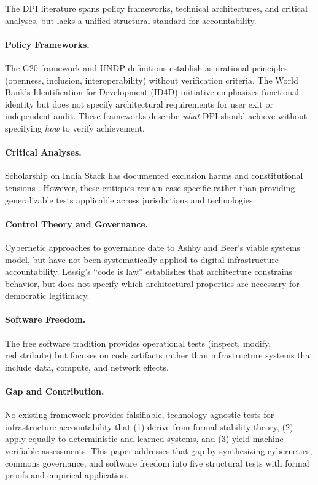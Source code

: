 \documentclass{article}
\begin{document}
The DPI literature spans policy frameworks, technical architectures, and critical analyses, but lacks a unified structural standard for accountability.

\paragraph{Policy Frameworks.} The G20 framework \citep{g20} and UNDP definitions \citep{undp} establish aspirational principles (openness, inclusion, interoperability) without verification criteria. The World Bank's Identification for Development (ID4D) initiative emphasizes functional identity but does not specify architectural requirements for user exit or independent audit. These frameworks describe \textit{what} DPI should achieve without specifying \textit{how} to verify achievement.

\paragraph{Critical Analyses.} Scholarship on India Stack has documented exclusion harms \citep{khera2019} and constitutional tensions \citep{bhatia2019}. However, these critiques remain case-specific rather than providing generalizable tests applicable across jurisdictions and technologies.

\paragraph{Control Theory and Governance.} Cybernetic approaches to governance date to Ashby \citep{ashby1956} and Beer's viable systems model, but have not been systematically applied to digital infrastructure accountability. Lessig's ``code is law'' \citep{lessig2006} establishes that architecture constrains behavior, but does not specify which architectural properties are necessary for democratic legitimacy.

\paragraph{Software Freedom.} The free software tradition \citep{stallman2002} provides operational tests (inspect, modify, redistribute) but focuses on code artifacts rather than infrastructure systems that include data, compute, and network effects.

\paragraph{Gap and Contribution.} No existing framework provides falsifiable, technology-agnostic tests for infrastructure accountability that (1) derive from formal stability theory, (2) apply equally to deterministic and learned systems, and (3) yield machine-verifiable assessments. This paper addresses that gap by synthesizing cybernetics, commons governance, and software freedom into five structural tests with formal proofs and empirical application.
\end{document}
